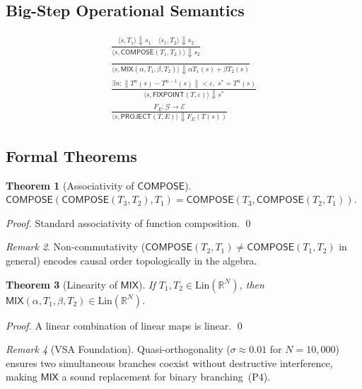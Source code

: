 \documentclass[10pt,twocolumn]{article}
\theoremstyle{plain}
\newtheorem{theorem}{Theorem}[section]
\theoremstyle{definition}
\theoremstyle{remark}
\newtheorem{remark}[theorem]{Remark}
\newcommand{\RR}{\mathbb{R}}
\newcommand{\Compose}{\mathsf{COMPOSE}}
\newcommand{\Mix}{\mathsf{MIX}}
\newcommand{\Fixpoint}{\mathsf{FIXPOINT}}
\newcommand{\Project}{\mathsf{PROJECT}}
\newcommand{\norm}[1]{\left\|#1\right\|}
\begin{document}
\subsection{Big-Step Operational Semantics}

\begin{gather*}
\frac{\langle s,T_1\rangle\Downarrow s_1\quad\langle s_1,T_2\rangle\Downarrow s_2}
     {\langle s,\Compose(T_1,T_2)\rangle\Downarrow s_2}\tag{E-Compose}\\[4pt]
\frac{}{\langle s,\Mix(\alpha,T_1,\beta,T_2)\rangle\Downarrow
        \alpha T_1(s){+}\beta T_2(s)}\tag{E-Mix}\\[4pt]
\frac{\exists n:\norm{T^n(s)-T^{n-1}(s)}<\varepsilon,\;s^*=T^n(s)}
     {\langle s,\Fixpoint(T,\varepsilon)\rangle\Downarrow s^*}\tag{E-Fix}\\[4pt]
\frac{F_E:\mathcal{G}\to\mathcal{E}}
     {\langle s,\Project(T,E)\rangle\Downarrow F_E(T(s))}\tag{E-Proj}
\end{gather*}

\subsection{Formal Theorems}
\label{sec:theorems}

\begin{theorem}[Associativity of $\Compose$]
\label{thm:assoc}
$\Compose(\Compose(T_3,T_2),T_1) = \Compose(T_3,\Compose(T_2,T_1))$.
\end{theorem}
\begin{proof}
Standard associativity of function composition. \qed
\end{proof}

\begin{remark}
Non-commutativity ($\Compose(T_2,T_1)\neq\Compose(T_1,T_2)$ in general)
encodes causal order topologically in the algebra.
\end{remark}

\begin{theorem}[Linearity of $\Mix$]
\label{thm:linear}
If $T_1,T_2\in\mathrm{Lin}(\RR^N)$, then $\Mix(\alpha,T_1,\beta,T_2)
\in\mathrm{Lin}(\RR^N)$.
\end{theorem}
\begin{proof}
A linear combination of linear maps is linear. \qed
\end{proof}

\begin{remark}[VSA Foundation]
Quasi-orthogonality ($\sigma\approx0.01$ for $N=10{,}000$) ensures two
simultaneous branches coexist without destructive interference, making $\Mix$
a sound replacement for binary branching~(P4).
\end{remark}
\end{document}
